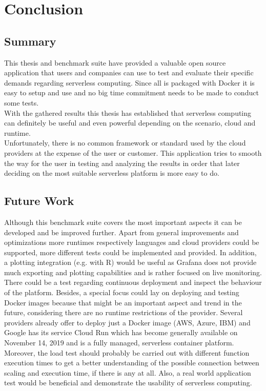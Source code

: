 \chapter{Conclusion}
\section{Summary}
This thesis and benchmark suite have provided a valuable open source application that users and companies can use to test and evaluate their specific demands regarding serverless computing. Since all is packaged with Docker it is easy to setup and use and no big time commitment needs to be made to conduct some tests.\\
With the gathered results this thesis has established that serverless computing can definitely be useful and even powerful depending on the scenario, cloud and runtime.\\
Unfortunately, there is no common framework or standard used by the cloud providers at the expense of the user or customer. This application tries to smooth the way for the user in testing and analyzing the results in order that later deciding on the most suitable serverless platform is more easy to do.
\section{Future Work}
Although this benchmark suite covers the most important aspects it can be developed and be improved further. Apart from general improvements and optimizations more runtimes respectively languages and cloud providers could be supported, more different tests could be implemented and provided. In addition, a plotting integration (e.g. with R) would be useful as Grafana does not provide much exporting and plotting capabilities and is rather focused on live monitoring.\\
There could be a test regarding continuous deployment and inspect the behaviour of the platform. Besides, a special focus could lay on deploying and testing Docker images because that might be an important aspect and trend in the future, considering there are no runtime restrictions of the provider. Several providers already offer to deploy just a Docker image (AWS, Azure, IBM) and Google has its service Cloud Run which has become generally available on November 14, 2019 \cite{cloudrun} and is a fully managed, serverless container platform.\\ Moreover, the load test should probably be carried out with different function execution times to get a better understanding of the possible connection between scaling and execution time, if there is any at all. Also, a real world application test would be beneficial and demonstrate the usability of serverless computing.